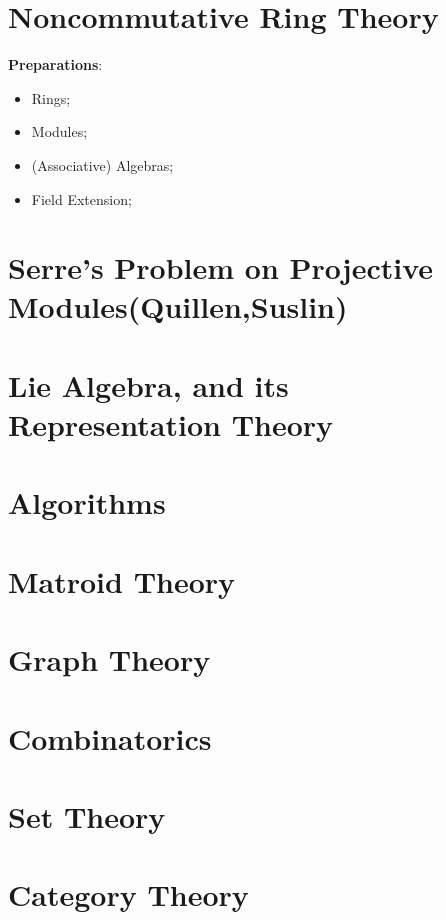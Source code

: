 \documentclass{ModulEN}
\begin{document}
	\part{Noncommutative Ring Theory}
		\textbf{Preparations}:
		
		\begin{itemize}
			\item Rings;
			\item Modules;
			\item (Associative) Algebras;
			\item Field Extension;
		\end{itemize}
		
		
		
		
	\part{Serre's Problem on Projective Modules(Quillen,Suslin)}	
	
		
	\part{Lie Algebra, and its Representation Theory}
		
	
	\part{Algorithms}
	
	\part{Matroid Theory}
	
	\part{Graph Theory}
	
		
	
	\part{Combinatorics}
	
	\part{Set Theory}
	
	\part{Category Theory}
	
\end{document}
